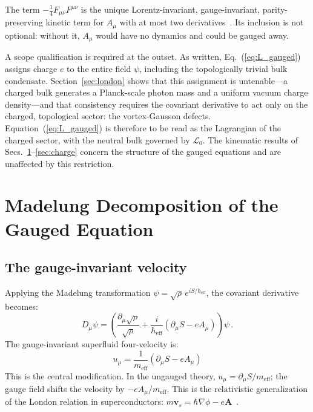 \documentclass[12pt, a4paper]{article}
\newcommand{\meff}{m_{\mathrm{eff}}}
\newcommand{\heff}{\hbar_{\mathrm{eff}}}
\begin{document}
The term $-\frac{1}{4}F_{\mu\nu}F^{\mu\nu}$ is the unique Lorentz-invariant, gauge-invariant, parity-preserving kinetic term for $A_\mu$ with at most two derivatives~\cite{weinberg_1995}. Its inclusion is not optional: without it, $A_\mu$ would have no dynamics and could be gauged away.

A scope qualification is required at the outset. As written, Eq.~(\ref{eq:L_gauged}) assigns charge $e$ to the entire field $\psi$, including the topologically trivial bulk condensate. Section~\ref{sec:london} shows that this assignment is untenable---a charged bulk generates a Planck-scale photon mass and a uniform vacuum charge density---and that consistency requires the covariant derivative to act only on the charged, topological sector: the vortex-Gausson defects. Equation~(\ref{eq:L_gauged}) is therefore to be read as the Lagrangian of the charged sector, with the neutral bulk governed by $\mathcal{L}_0$. The kinematic results of Secs.~\ref{sec:madelung}--\ref{sec:charge} concern the structure of the gauged equations and are unaffected by this restriction.

\section{Madelung Decomposition of the Gauged Equation}
\label{sec:madelung}

\subsection{The gauge-invariant velocity}

Applying the Madelung transformation $\psi = \sqrt{\rho}\,e^{iS/\heff}$, the covariant derivative becomes:
\begin{equation}
    D_\mu\psi = \left(\frac{\partial_\mu\sqrt{\rho}}
    {\sqrt{\rho}} + \frac{i}{\heff}
    (\partial_\mu S - eA_\mu)\right)\psi\,.
\end{equation}
The gauge-invariant superfluid four-velocity is:
\begin{equation}
    \boxed{\;u_\mu = \frac{1}{\meff}
    (\partial_\mu S - eA_\mu)\;}
\label{eq:u_gauge}
\end{equation}
This is the central modification. In the ungauged theory, $u_\mu = \partial_\mu S/\meff$; the gauge field shifts the velocity by $-eA_\mu/\meff$. This is the relativistic generalization of the London relation in superconductors: $m\mathbf{v}_s = \hbar\nabla\phi - e\mathbf{A}$~\cite{london_1935}.
\end{document}
